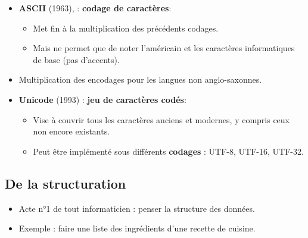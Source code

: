 \begin{slide}
  \begin{itemize}
    \item \textbf{ASCII} (1963),  : \textbf{codage de caractères}:
      \begin{itemize}
	\item Met fin à la multiplication des précédents codages.
	\item Mais ne permet que de noter l'américain et les caractères informatiques de base (pas d'accents).
      \end{itemize}
    \item Multiplication des encodages pour les langues non anglo-saxonnes.
    \item \textbf{Unicode} (1993) : \textbf{jeu de caractères codés}:
      \begin{itemize}
	\item Vise à couvrir tous les caractères anciens et modernes, y compris ceux non encore existants.
	\item Peut être implémenté sous différents \textbf{codages} : UTF-8, UTF-16, UTF-32.
      \end{itemize}
  \end{itemize}
\end{slide}

\subsection{De la structuration}
\begin{slide}
  \begin{itemize}
    \item Acte n°1 de tout informaticien : penser la structure des données.
    \item Exemple : faire une liste des ingrédients d'une recette de cuisine.
  \end{itemize}
\end{slide}

